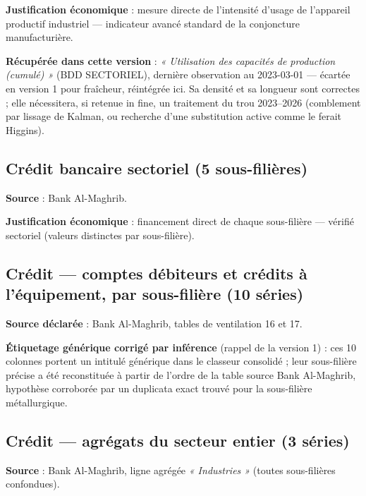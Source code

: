 \documentclass[11pt,a4paper]{article}
\begin{document}
\textbf{Justification économique} : mesure directe de l'intensité d'usage de l'appareil productif industriel --- indicateur avancé standard de la conjoncture manufacturière.

\begin{alertebox}
\textbf{Récupérée dans cette version} : \textit{« Utilisation des capacités de production (cumulé) »} (BDD SECTORIEL), dernière observation au 2023-03-01 --- écartée en version 1 pour fraîcheur, réintégrée ici. Sa densité et sa longueur sont correctes ; elle nécessitera, si retenue in fine, un traitement du trou 2023--2026 (comblement par lissage de Kalman, ou recherche d'une substitution active comme le ferait Higgins).
\end{alertebox}

\subsection{Crédit bancaire sectoriel (5 sous-filières)}

\textbf{Source} : Bank Al-Maghrib.

\textbf{Justification économique} : financement direct de chaque sous-filière --- vérifié sectoriel (valeurs distinctes par sous-filière).

\subsection{Crédit --- comptes débiteurs et crédits à l'équipement, par sous-filière (10 séries)}

\textbf{Source déclarée} : Bank Al-Maghrib, tables de ventilation 16 et 17.

\begin{alertebox}
\textbf{Étiquetage générique corrigé par inférence} (rappel de la version 1) : ces 10 colonnes portent un intitulé générique dans le classeur consolidé ; leur sous-filière précise a été reconstituée à partir de l'ordre de la table source Bank Al-Maghrib, hypothèse corroborée par un duplicata exact trouvé pour la sous-filière métallurgique.
\end{alertebox}

\subsection{Crédit --- agrégats du secteur entier (3 séries)}

\textbf{Source} : Bank Al-Maghrib, ligne agrégée \textit{« Industries »} (toutes sous-filières confondues).
\end{document}
